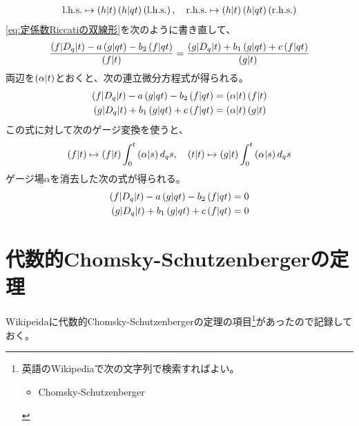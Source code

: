{\begin{equation*}
\begin{split}
		\text{l.h.s.} \mapsto \plr{h|t}\plr{h|qt}\plr{\text{l.h.s.}}
		,\quad \text{r.h.s.} \mapsto \plr{h|t}\plr{h|qt} \plr{\text{r.h.s.}}
	\end{split}\end{equation*}
	\eqref{eq:定係数Riccatiの双線形}を次のように書き直して、
	\begin{equation*}\begin{split}
		\frac{\plr{f|D_q|t} - a\plr{g|qt} - b_2\plr{f|qt}}{\plr{f|t}}
		= \frac{\plr{g|D_q|t}+ b_1\plr{g|qt} + c\plr{f|qt}} {\plr{g|t}}
	\end{split}\end{equation*}
	両辺を$\plr{\alpha|t}$とおくと、次の連立微分方程式が得られる。
	\begin{equation*}\begin{split}
		\plr{f|D_q|t} - a\plr{g|qt} - b_2\plr{f|qt} 
		&= \plr{\alpha|t}\plr{f|t} \\
		\plr{g|D_q|t} + b_1\plr{g|qt} + c\plr{f|qt} &= \plr{\alpha|t}\plr{g|t}
	\end{split}\end{equation*}
	この式に対して次のゲージ変換を使うと、
	\begin{equation*}\begin{split}
		\plr{f|t}\mapsto \plr{f|t}\int_0^t\plr{\alpha|s}d_qs
		,\quad \plr{t|t}\mapsto \plr{g|t}\int_0^t\plr{\alpha|s}d_qs
	\end{split}\end{equation*}
	ゲージ場$\alpha$を消去した次の式が得られる。
	\begin{equation*}\begin{split}
		\plr{f|D_q|t} - a\plr{g|qt} - b_2\plr{f|qt} &= 0 \\
		\plr{g|D_q|t} + b_1\plr{g|qt} + c\plr{f|qt} &= 0
	\end{split}\end{equation*}
\section{代数的Chomsky-Schutzenbergerの定理}\label{s1:代数的Chomsky-Schutzenbergerの定理} %
	Wikipeidaに代数的Chomsky-Schutzenbergerの定理の項目\footnote{
		英語のWikipediaで次の文字列で検索すればよい。
		\begin{itemize}\setlength{\itemsep}{-1mm} %
			\item Chomsky-Schutzenberger
		\end{itemize} %
	}があったので記録しておく。

}
